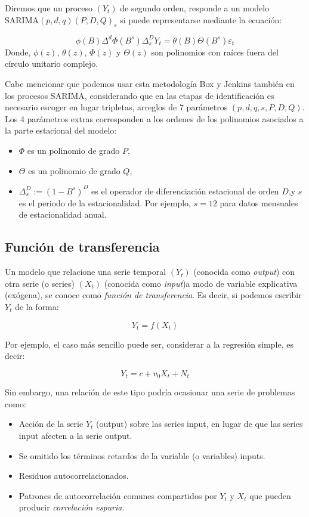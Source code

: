 \documentclass[12pt,oneside]{book}\usepackage[]{graphicx}\usepackage[]{color}
\theoremstyle{definition} %
\begin{document}
\begin{definicion}
Diremos que un proceso $(Y_t)$ de segundo orden,  responde a un modelo SARIMA$(p,d,q)(P,D,Q)_s$ si puede representarse mediante la ecuación:

\begin{equation}
\phi  (B)\Delta^d \Phi (B^s) \Delta _s^DY_t = \theta  (B) \Theta (B^s)\varepsilon_t
\label{eq:sarima_def}
\end{equation}
Donde, $\phi (z)$, $\theta (z)$, $\Phi (z)$ y $\Theta (z)$ son polinomios con raíces fuera del círculo unitario complejo.

\end{definicion}

Cabe mencionar que podemos usar esta metodología Box y Jenkins también en los procesos SARIMA, considerando que en las etapas de identificación es necesario escoger en lugar tripletas, arreglos de 7 parámetros $(p,d,q,s,P,D,Q)$. 
Los 4 parámetros extras corresponden a los ordenes de los polinomios asociados a la parte estacional del modelo: 

\begin{itemize}
\item $\Phi $ es un polinomio de grado $P$,
\item $\Theta $ es un polinomio de grado $Q$,
\item $\Delta _s^D:=(1-B^s)^D$ es el operador de diferenciación estacional de orden $D$,y $s$ es el periodo de la estacionalidad.  Por ejemplo, $s=12$ para datos mensuales de estacionalidad anual.
\end{itemize}


\subsection{Función de transferencia}

Un modelo que relacione una serie temporal $(Y_t)$ (conocida como \textit{output}) con otra serie (o series) $(X_t)$ (conocida como \textit{input})a modo de variable explicativa (exógena), se conoce como \textit{función de transferencia}. Es decir, si podemos escribir $Y_t$ de la forma:

$$Y_t= f(X_t)$$

Por ejemplo, el caso más sencillo puede ser, considerar a la regresión simple, es decir:

$$Y_t = c + v_0X_t + N_t$$

Sin embargo, una relación de este tipo podría ocasionar una serie de problemas como:
\begin{itemize}
\item Acción de la serie $Y_t$ (output) sobre las series input, en lugar de que las series input afecten a la serie output.
\item Se omitido los términos retardos de la variable (o variables) inputs.
\item Residuos autocorrelacionados.
\item Patrones de autocorrelación comunes compartidos por $Y_t$ y $X_t$ que pueden producir \textit{correlación espuria}.
\end{itemize}
\end{document}
